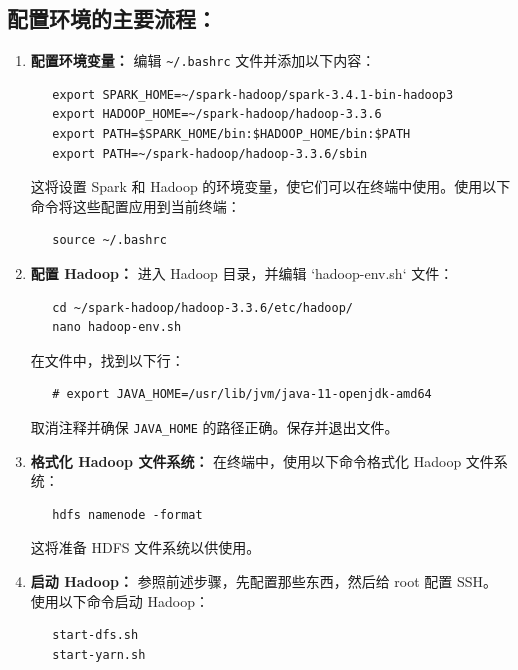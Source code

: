 \documentclass{article}
\begin{document}
\subsection*{配置环境的主要流程：}
\begin{enumerate}
    \item \textbf{配置环境变量：} 编辑 \verb|~/.bashrc| 文件并添加以下内容：
    
    \begin{verbatim}
   export SPARK_HOME=~/spark-hadoop/spark-3.4.1-bin-hadoop3
   export HADOOP_HOME=~/spark-hadoop/hadoop-3.3.6
   export PATH=$SPARK_HOME/bin:$HADOOP_HOME/bin:$PATH
   export PATH=~/spark-hadoop/hadoop-3.3.6/sbin
    \end{verbatim}

   这将设置 Spark 和 Hadoop 的环境变量，使它们可以在终端中使用。使用以下命令将这些配置应用到当前终端：

    \begin{verbatim}
   source ~/.bashrc
    \end{verbatim}
    
    \item \textbf{配置 Hadoop：} 进入 Hadoop 目录，并编辑 `hadoop-env.sh` 文件：
   
    \begin{verbatim}
   cd ~/spark-hadoop/hadoop-3.3.6/etc/hadoop/
   nano hadoop-env.sh
    \end{verbatim}

    在文件中，找到以下行：
   
    \begin{verbatim}
   # export JAVA_HOME=/usr/lib/jvm/java-11-openjdk-amd64
    \end{verbatim}

    取消注释并确保 \texttt{JAVA\_HOME} 的路径正确。保存并退出文件。

    \item \textbf{格式化 Hadoop 文件系统：} 在终端中，使用以下命令格式化 Hadoop 文件系统：

    \begin{verbatim}
   hdfs namenode -format
    \end{verbatim}

   这将准备 HDFS 文件系统以供使用。

    \item \textbf{启动 Hadoop：} 参照前述步骤，先配置那些东西，然后给 root 配置 SSH。使用以下命令启动 Hadoop：

    \begin{verbatim}
   start-dfs.sh
   start-yarn.sh
    \end{verbatim}


\end{enumerate}
\end{document}
